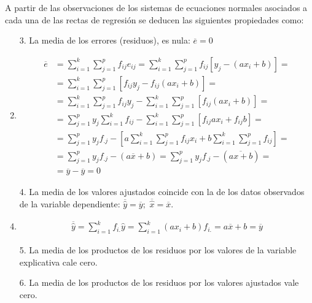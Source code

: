 \documentclass[10pt, a4paper]{article}
\makeatletter
\renewenvironment{proof}[1][\proofname] {\par\pushQED{\qed}\normalfont\topsep6\p@\@plus6\p@\relax\trivlist\item[\hskip\labelsep\itshape\sffamily#1\@addpunct{.}]\ignorespaces}{\popQED\endtrivlist\@endpefalse}
\theoremstyle{theorem-style}
\theoremstyle{definition-style}
\theoremstyle{remark-style}
\theoremstyle{example-style}
\theoremstyle{definition-style}
\theoremstyle{remark-style}
\makeatother
\begin{document}
A partir de las observaciones de los sistemas de ecuaciones normales asociados a
cada una de las rectas de regresión se deducen las siguientes propiedades
como:
\begin{enumerate}
\item[3.] La media de los errores (residuos), es nula: $\overline{e} = 0$

\begin{proof}
\begin{align*}
\overline{e} &= \sum_{i=1}^k\sum_{j=1}^p f_{ij}e_{ij}
						 = \sum_{i=1}^k\sum_{j=1}^p f_{ij}[y_j - (ax_i +b)]  = \\
						 &= \sum_{i=1}^k\sum_{j=1}^p [f_{ij}y_j - f_ {ij}(ax_i +b)] = \\
						 &= \sum_{i=1}^k\sum_{j=1}^p f_{ij}y_j -
						 	 \sum_{i=1}^k\sum_{j=1}^p [f_ {ij}(ax_i +b)] = \\
						 &= \sum_{j=1}^p y_j \sum_{i=1}^k f_{ij} -
						 		\sum_{i=1}^k\sum_{j=1}^p [f_{ij}ax_i + f_{ij}b] = \\
						 &= \sum_{j=1}^p y_j f_{.j}
						 				- \left[a\sum_{i=1}^k\sum_{j=1}^p f_{ij} x_i
						 				+ b\sum_{i=1}^k\sum_{j=1}^p f_{ij}\right] = \\
							&= \sum_{j=1}^p y_j f_{.j} - (a\overline{x}+b)
							= \sum_{j=1}^p y_j f_{.j} - (\overline{ax+b}) = \\
							&= \overline{y} - \overline{y} = 0
\end{align*}
\end{proof}

\item[4.] La media de los valores ajustados coincide con la de los datos observados
de la variable dependiente: $\overline{\hat{y}} = \overline{y}; $
$\overline{\hat{x}} = \overline{x}$.

\begin{proof} 
\begin{align*}
\overline{\hat{y}} = \sum_{i=1}^k f_{i.} \hat{y} =
											\sum_{i=1}^k (ax_i +b)f_{i.} =
										 a\overline{x} +b = \overline{y}
\end{align*}
\end{proof}

\item[5.] La media de los productos de los residuos por los
valores de la variable explicativa cale cero. 
\item[6.] La media de los productos de
los residuos por los valores ajustados vale cero.
\end{enumerate}
\end{document}
